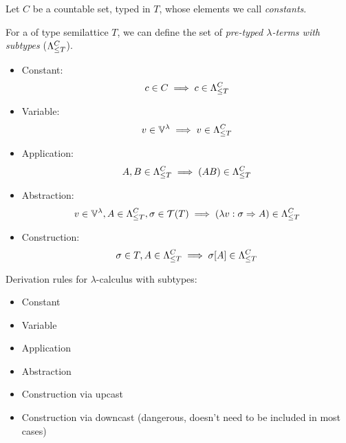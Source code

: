 \documentclass[main.tex]{subfiles}
\begin{document}
\begin{defn}
    Let $C$ be a countable set, typed in $T$,
    whose elements we call \emph{constants}.

    For a of type semilattice $T$, we can define the set of
    \emph{pre-typed $\lambda$-terms with subtypes} ($\fancylambda{T}{C}$).

    \begin{itemize}
        \item Constant:    \[ c \in C \implies c \in \fancylambda{T}{C} \]
        \item Variable:    \[ v \in \lvars \implies v \in \fancylambda{T}{C} \]
        \item Application: \[ A, B \in \fancylambda{T}{C} \implies (AB) \in \fancylambda{T}{C} \]
        \item Abstraction: \[ v \in \lvars, A \in \fancylambda{T}{C}, \sigma \in \tclos{T}
                \implies (\lambda v : \sigma \abstr A) \in \fancylambda{T}{C} \]
        \item Construction: \[ \sigma \in T, A \in \fancylambda{T}{C}
                \implies \sigma[A] \in \fancylambda{T}{C} \]
    \end{itemize}
\end{defn}

\begin{defn}
    Derivation rules for $\lambda$-calculus with subtypes:

    \begin{itemize}
        \item Constant
        \item Variable
        \item Application
        \item Abstraction
        \item Construction via upcast
        \item Construction via downcast (dangerous, doesn't need to be included in most cases)
    \end{itemize}
\end{defn}
\end{document}

